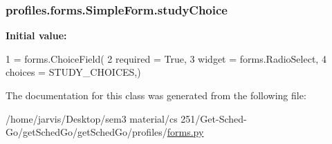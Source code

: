 \subsubsection[{\texorpdfstring{study\+Choice}{studyChoice}}]{\setlength{\rightskip}{0pt plus 5cm}profiles.\+forms.\+Simple\+Form.\+study\+Choice\hspace{0.3cm}{\ttfamily [static]}}\hypertarget{classprofiles_1_1forms_1_1SimpleForm_ada90dea452920f838181a9984b90e965}{}\label{classprofiles_1_1forms_1_1SimpleForm_ada90dea452920f838181a9984b90e965}
{\bfseries Initial value\+:}
\begin{DoxyCode}
1 = forms.ChoiceField(
2         required = \textcolor{keyword}{True},
3         widget = forms.RadioSelect,
4         choices  = STUDY\_CHOICES,)
\end{DoxyCode}


The documentation for this class was generated from the following file\+:\begin{DoxyCompactItemize}
\item 
/home/jarvis/\+Desktop/sem3 material/cs 251/\+Get-\/\+Sched-\/\+Go/get\+Sched\+Go/get\+Sched\+Go/profiles/\hyperlink{profiles_2forms_8py}{forms.\+py}\end{DoxyCompactItemize}
